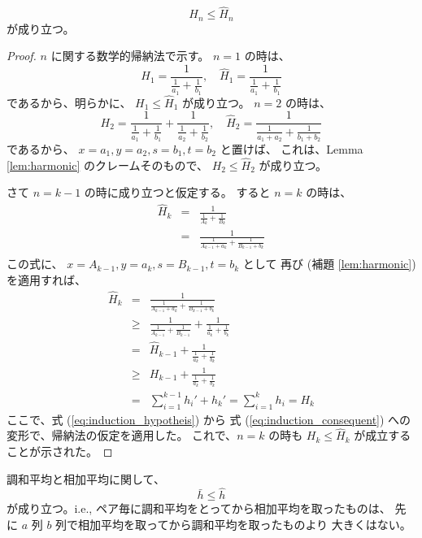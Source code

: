 \documentclass[12pt]{jsarticle}
\def\arithmean#1{\bar{#1}}
\def\arithsum#1{#1}
\def\harmmean#1{\hat{#1}}
\def\harmformula#1#2#3{\frac{#1}{\frac{1}{#2} + \frac{1}{#3}}}
\begin{document}
\begin{theorem}
\begin{equation}
\arithsum{H_n} \le \harmmean{H}_{n}
\end{equation}
が成り立つ。
\end{theorem}

\begin{proof}
$n$ に関する数学的帰納法で示す。
$n=1$ の時は、
\begin{equation}
\arithsum{H}_{1} = \harmformula{1}{a_1}{b_1}, \quad
\harmmean{H}_{1} = \harmformula{1}{a_1}{b_1}
\end{equation}
であるから、明らかに、
$\arithsum{H}_{1} \le \harmmean{H}_{1}$
が成り立つ。
$n = 2$ の時は、
\begin{equation}
\arithsum{H}_{2} = \harmformula{1}{a_1}{b_1} + \harmformula{1}{a_2}{b_2},
\quad
\harmmean{H}_{2} = \harmformula{1}{a_1 + a_2}{b_1 + b_2}
\end{equation}
であるから、
$x = a_1, y = a_2, s = b_1, t = b_2$ と置けば、
これは、Lemma \ref{lem:harmonic} のクレームそのもので、
$\arithsum{H_2} \le \harmmean{H}_{2}$
が成り立つ。

さて $n = k - 1$ の時に成り立つと仮定する。
すると $n = k$ の時は、
\begin{eqnarray}
\harmmean{H}_{k} &=& \harmformula{1}{A_k}{B_k} \\
&=& \harmformula{1}{A_{k-1} + a_k}{B_{k-1} + b_k} \\
\end{eqnarray}
この式に、
$x = A_{k-1}, y = a_k, s = B_{k-1}, t = b_k$ として
再び (補題 \ref{lem:harmonic}) を適用すれば、
\begin{eqnarray}
\harmmean{H}_{k}
&=& \harmformula{1}{A_{k-1} + a_k}{B_{k-1} + b_k} \nonumber \\
&\ge& \harmformula{1}{A_{k-1}}{B_{k-1}} + \harmformula{1}{a_k}{b_k} \\
&=& \harmmean{H}_{k-1} + \harmformula{1}{a_k}{b_k}
\label{eq:induction_hypotheis} \\
&\ge& \arithsum{H}_{k-1} + \harmformula{1}{a_k}{b_k}
\label{eq:induction_consequent} \\
&=& \sum_{i=1}^{k-1} {h_i}' + {h_k}'
= \sum_{i=1}^{k} {h_i} = \arithsum{H}_{k}
\end{eqnarray}
ここで、式 (\ref{eq:induction_hypotheis}) から
式 (\ref{eq:induction_consequent}) への変形で、帰納法の仮定を適用した。
これで、$n = k$ の時も
$\arithsum{H}_{k} \le \harmmean{H}_{k}$
が成立することが示された。
\end{proof}

\begin{corollary}
調和平均と相加平均に関して、
\begin{equation}
\arithmean{h} \le \harmmean{h}
\end{equation}
が成り立つ。i.e.,
ペア毎に調和平均をとってから相加平均を取ったものは、
先に $a$ 列 $b$ 列で相加平均を取ってから調和平均を取ったものより
大きくはない。
\end{corollary}
\end{document}
